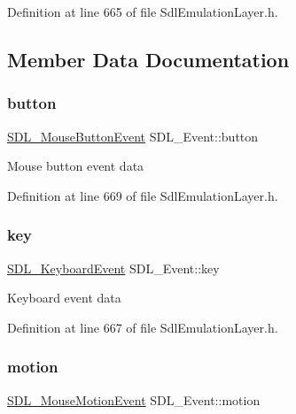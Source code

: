 Definition at line 665 of file Sdl\+Emulation\+Layer.\+h.



\subsection{Member Data Documentation}
\mbox{\label{union_s_d_l___event_ab6da2fa2687e5f849f270adecc64785f}} 
\subsubsection{\texorpdfstring{button}{button}}
{\footnotesize\ttfamily \hyperlink{struct_s_d_l___mouse_button_event}{S\+D\+L\+\_\+\+Mouse\+Button\+Event} S\+D\+L\+\_\+\+Event\+::button}

Mouse button event data 

Definition at line 669 of file Sdl\+Emulation\+Layer.\+h.

\mbox{\label{union_s_d_l___event_ab99927835cc77a9b6bb50b419b4a27df}} 
\subsubsection{\texorpdfstring{key}{key}}
{\footnotesize\ttfamily \hyperlink{struct_s_d_l___keyboard_event}{S\+D\+L\+\_\+\+Keyboard\+Event} S\+D\+L\+\_\+\+Event\+::key}

Keyboard event data 

Definition at line 667 of file Sdl\+Emulation\+Layer.\+h.

\mbox{\label{union_s_d_l___event_ac3c89e190faacbe84280cd539453bab6}} 
\subsubsection{\texorpdfstring{motion}{motion}}
{\footnotesize\ttfamily \hyperlink{struct_s_d_l___mouse_motion_event}{S\+D\+L\+\_\+\+Mouse\+Motion\+Event} S\+D\+L\+\_\+\+Event\+::motion}

